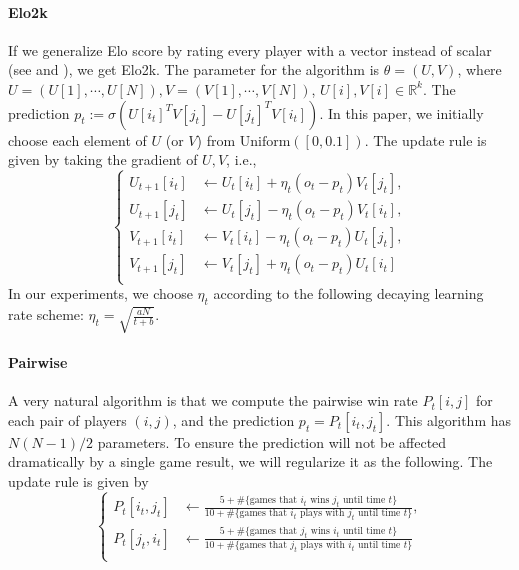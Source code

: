 \paragraph{Elo2k} If we generalize Elo score by rating every player with a vector instead of scalar (see \cite{balduzzi2018re} and \cite{bertrand2023limitations}), we get Elo2k. The parameter for the algorithm is  $\theta = (U, V)$, where $U= (U[1], \cdots, U[N]), V = (V[1], \cdots, V[N])$, $U[i], V[i] \in \mathbb{R}^{k}$. The prediction $p_t:=\sigma(U[i_t]^{T}V[j_t]-U[j_t]^{T}V[i_t])$. In this paper, we initially choose each element of $U$ (or $V$) from $\text{Uniform}([0,0.1])$. 
The update rule is given by taking the gradient of $U,V$, i.e.,
\begin{equation}
    \begin{cases}
    U_{t+1}[i_t] &\gets U_{t}[i_t] + \eta_t \left(o_t - p_t\right) V_{t}[j_t] ,\\
    U_{t+1}[j_t] &\gets U_{t}[j_t] - \eta_t \left(o_t - p_t\right) V_{t}[i_t] ,\\

    V_{t+1}[i_t] &\gets V_{t}[i_t] - \eta_t \left(o_t - p_t\right) U_{t}[j_t] ,\\
    V_{t+1}[j_t] &\gets V_{t}[j_t] + \eta_t \left(o_t - p_t\right) U_{t}[i_t] \\
    \end{cases}
\end{equation}
In our experiments, we choose $\eta_t$ according to the following decaying learning rate scheme: $\eta_t = \sqrt{\frac{aN}{t+b}}$.

\paragraph{Pairwise} A very natural algorithm is that we compute the pairwise win rate $P_t[i,j]$ for each pair of players $(i,j)$, and the prediction $p_t = P_t[i_t,j_t] $. This algorithm has $N(N-1)/2$ parameters. To ensure the prediction will not be affected dramatically by a single game result, we will regularize it as the following. The update rule is given by
\begin{equation}
    \begin{cases}
    P_{t}[i_t, j_t] &\gets \frac{5 + \# \{ \text{games that } i_t \text{ wins } j_t \text{ until time } t\} }{10 + \# \{ \text{games that } i_t \text{ plays with } j_t \text{ until time } t\}} ,\\
    P_{t}[j_t, i_t] &\gets \frac{5 + \# \{ \text{games that } j_t \text{ wins } i_t \text{ until time } t\} }{10 + \# \{ \text{games that } j_t \text{ plays with } i_t \text{ until time } t\}} \\

    \end{cases}
\end{equation}

